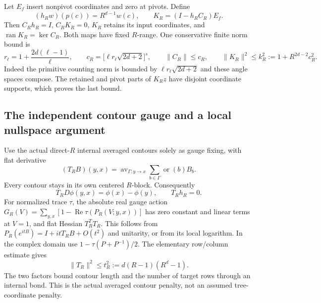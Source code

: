 \documentclass[11pt]{article}
\theoremstyle{remark}
\begin{document}
Let $E_f$ insert nonpivot coordinates and zero at pivots. Define
\begin{equation}
 (h_Rw)(p(c))=R^{d-1}w(c),\qquad
 K_R=(I-h_RC_R)E_f.
 \label{cmq-retained-map}
\end{equation}
Then $C_Rh_R=I$, $C_RK_R=0$, $K_R$ retains its input coordinates,
and $\operatorname{ran}K_R=\ker C_R$. Both maps have fixed
$R$-range. One conservative finite norm bound is
\begin{equation}
 r_\ell=1+\frac{2d(\ell-1)}\ell,\qquad
 c_R=\big[\ell r_\ell\sqrt{2d+2}\big]^s,\qquad
 \|C_R\|\leq c_R,\qquad
 \|K_R\|^2\leq k_R^2:=1+R^{2d-2}c_R^2.
 \label{cmq-retained-upper}
\end{equation}
Indeed the primitive counting norm is bounded by
$\ell r_\ell\sqrt{2d+2}$ and these angle spaces compose.
The retained and pivot parts of $K_Rz$ have disjoint coordinate
supports, which proves the last bound.

\subsection{The independent contour gauge and a local nullspace argument}
\label{cmq-patch-section}

Use the actual direct-$R$ internal averaged contours solely as
gauge fixing, with flat derivative
\begin{equation}
 (T_RB)(y,x)=\operatorname{av}_{\Gamma:y\to x}
              \sum_{b\in\Gamma}\operatorname{or}(b)B_b.
 \label{cmq-contour}
\end{equation}
Every contour stays in its own centered $R$-block. Consequently
\begin{equation}
 T_RD\phi(y,x)=\phi(x)-\phi(y),\qquad T_Rh_R=0.
 \label{cmq-contour-gradient}
\end{equation}
For normalized trace $\tau$, the absolute real gauge action
$G_R(V)=\sum_{y,x}[1-\operatorname{Re}\tau(P_R(V;y,x))]$
has zero constant and linear terms at $V=1$, and flat Hessian
$T_R^TT_R$. This follows from
$P_R(e^{itB})=I+itT_RB+O(t^2)$ and unitarity, or from its
local logarithm. In the complex domain use
$1-\tau(P+P^{-1})/2$. The elementary row/column estimate gives
\begin{equation}
 \|T_R\|^2\leq t_R^2:=d(R-1)(R^d-1).
 \label{cmq-contour-upper}
\end{equation}
The two factors bound contour length and the number of target
rows through an internal bond. This is the actual averaged
contour penalty, not an assumed tree-coordinate penalty.
\end{document}

